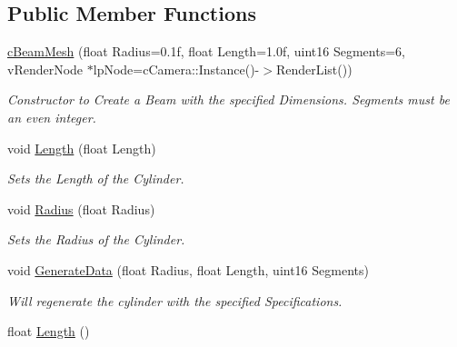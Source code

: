 \subsection*{Public Member Functions}
\begin{DoxyCompactItemize}
\item 
\hypertarget{classc_beam_mesh_acf82cda9d282def977903ff877f36a26}{
\hyperlink{classc_beam_mesh_acf82cda9d282def977903ff877f36a26}{cBeamMesh} (float Radius=0.1f, float Length=1.0f, uint16 Segments=6, vRenderNode $\ast$lpNode=cCamera::Instance()-\/$>$RenderList())}
\label{classc_beam_mesh_acf82cda9d282def977903ff877f36a26}

\begin{DoxyCompactList}\small\item\em Constructor to Create a Beam with the specified Dimensions. Segments must be an even integer. \end{DoxyCompactList}\item 
\hypertarget{classc_beam_mesh_a1d2f2bfef0e3f96597ae6e1e73072030}{
void \hyperlink{classc_beam_mesh_a1d2f2bfef0e3f96597ae6e1e73072030}{Length} (float Length)}
\label{classc_beam_mesh_a1d2f2bfef0e3f96597ae6e1e73072030}

\begin{DoxyCompactList}\small\item\em Sets the Length of the Cylinder. \end{DoxyCompactList}\item 
\hypertarget{classc_beam_mesh_ac11934e813765321e76405cd96304088}{
void \hyperlink{classc_beam_mesh_ac11934e813765321e76405cd96304088}{Radius} (float Radius)}
\label{classc_beam_mesh_ac11934e813765321e76405cd96304088}

\begin{DoxyCompactList}\small\item\em Sets the Radius of the Cylinder. \end{DoxyCompactList}\item 
\hypertarget{classc_beam_mesh_ab59d3bb8c0a5c2944a206deaca3d2022}{
void \hyperlink{classc_beam_mesh_ab59d3bb8c0a5c2944a206deaca3d2022}{GenerateData} (float Radius, float Length, uint16 Segments)}
\label{classc_beam_mesh_ab59d3bb8c0a5c2944a206deaca3d2022}

\begin{DoxyCompactList}\small\item\em Will regenerate the cylinder with the specified Specifications. \end{DoxyCompactList}\item 
\hypertarget{classc_beam_mesh_aa4daa383162c2560c1c5ed47d22484e5}{
float \hyperlink{classc_beam_mesh_aa4daa383162c2560c1c5ed47d22484e5}{Length} ()}
\label{classc_beam_mesh_aa4daa383162c2560c1c5ed47d22484e5}


\end{DoxyCompactItemize}
